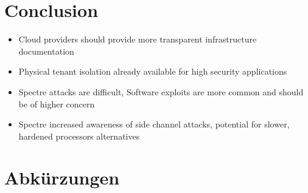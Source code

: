 \documentclass[conference,compsoc,final,a4paper]{IEEEtran}
\begin{document}
\section{Conclusion}
\begin{itemize}
  \item Cloud providers should provide more transparent infrastructure documentation
  \item Physical tenant isolation already available for high security applications
  \item Spectre attacks are difficult, Software exploits are more common and should be of higher concern
  \item Spectre increased awareness of side channel attacks, potential for slower, hardened processors alternatives
\end{itemize}
\section*{Abkürzungen}

\begin{acronym}[IaaS]
\end{acronym}

\printbibliography
\end{document}
